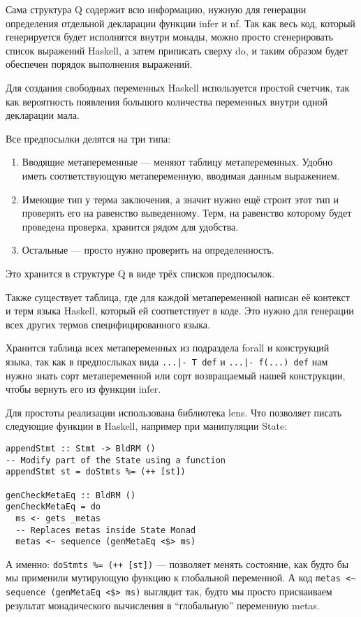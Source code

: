 Сама структура Q содержит всю информацию, нужную для генерации определения отдельной декларации функции infer и nf. Так как весь код, который генерируется будет исполнятся внутри монады, можно просто сгенерировать список выражений Haskell, а затем приписать сверху do, и таким образом будет обеспечен порядок выполнения выражений.

Для создания свободных переменных Haskell используется простой счетчик, так как вероятность появления большого количества переменных внутри одной декларации мала.

Все предпосылки делятся на три типа:
\begin{enumerate}
  \item Вводящие метапеременные --- меняют таблицу метапеременных. Удобно иметь соответствующую метапеременную, вводимая данным выражением.
  \item Имеющие тип у терма заключения, а значит нужно ещё строит этот тип и проверять его на равенство выведенному. Терм, на равенство которому будет проведена проверка, хранится рядом для удобства.
  \item Остальные --- просто нужно проверить на определенность.
\end{enumerate}

Это хранится в структуре Q в виде трёх списков предпосылок.

Также существует таблица, где для каждой метапеременной написан её контекст и терм языка Haskell, который ей соответствует в коде. Это нужно для генерации всех других термов специфицированного языка.

Хранится таблица всех метапеременных из подраздела forall и конструкций языка, так как в предпослыках вида \lstinline{...|- T def} и \lstinline{...|- f(...) def} нам нужно знать сорт метапеременной или сорт возвращаемый нашей конструкции, чтобы вернуть его из функции infer.

Для простоты реализации использована библиотека lens\cite{lens}. Что позволяет писать следующие функции в Haskell, например при манипуляции State:

\begin{lstlisting}[frame=single]
appendStmt :: Stmt -> BldRM ()
-- Modify part of the State using a function
appendStmt st = doStmts %= (++ [st])

genCheckMetaEq :: BldRM ()
genCheckMetaEq = do
  ms <- gets _metas
  -- Replaces metas inside State Monad
  metas <~ sequence (genMetaEq <$> ms)
\end{lstlisting}

А именно: \lstinline{doStmts %= (++ [st])} --- позволяет менять состояние, как будто бы мы применили мутирующую функцию к глобальной переменной. А код \lstinline{metas <~ sequence (genMetaEq <$> ms)} выглядит так, будто мы просто присваиваем результат монадического вычисления в ``глобальную'' переменную metas.











